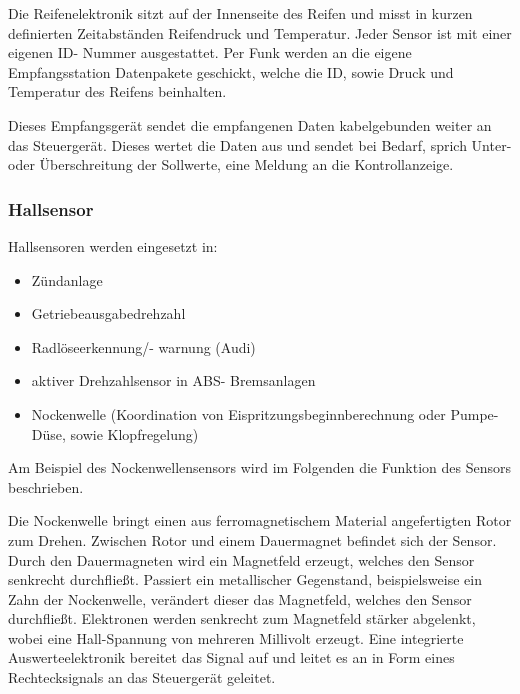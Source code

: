 \begin{flushleft}
	                
	                Die Reifenelektronik sitzt auf der Innenseite des Reifen und misst in kurzen definierten Zeitabständen Reifendruck und Temperatur. 
	                Jeder Sensor ist mit einer eigenen ID- Nummer ausgestattet. Per Funk werden an die eigene Empfangsstation Datenpakete geschickt, welche die ID, sowie Druck und Temperatur des Reifens beinhalten.
	
	                Dieses Empfangsgerät sendet die empfangenen Daten kabelgebunden weiter an das Steuergerät. Dieses wertet die Daten aus und sendet bei Bedarf, sprich Unter- oder Überschreitung der Sollwerte, eine Meldung an die Kontrollanzeige.
					
	                \subsubsection{Hallsensor}
	
					Hallsensoren werden eingesetzt in: 
					\begin{itemize}
						\item Zündanlage
						\item Getriebeausgabedrehzahl
						\item Radlöseerkennung/- warnung (Audi)
						\item aktiver Drehzahlsensor in ABS- Bremsanlagen
						\item Nockenwelle (Koordination von Eispritzungsbeginnberechnung oder Pumpe-Düse, sowie Klopfregelung)
					\end{itemize}
					
	                Am Beispiel des Nockenwellensensors wird im Folgenden die Funktion des Sensors beschrieben.
	                
	                Die Nockenwelle bringt einen aus ferromagnetischem Material angefertigten Rotor zum Drehen. Zwischen Rotor und einem Dauermagnet befindet sich der Sensor.
	                Durch den Dauermagneten wird ein Magnetfeld erzeugt, welches den Sensor senkrecht durchfließt. Passiert ein metallischer Gegenstand, beispielsweise ein Zahn der Nockenwelle, verändert dieser das Magnetfeld, welches den Sensor durchfließt.
					Elektronen werden senkrecht zum Magnetfeld stärker abgelenkt, wobei eine Hall-Spannung von mehreren Millivolt erzeugt. Eine integrierte Auswerteelektronik bereitet das Signal auf und leitet es an in Form eines Rechtecksignals an das Steuergerät geleitet. \cite{TS_hall}
	

\end{flushleft}
